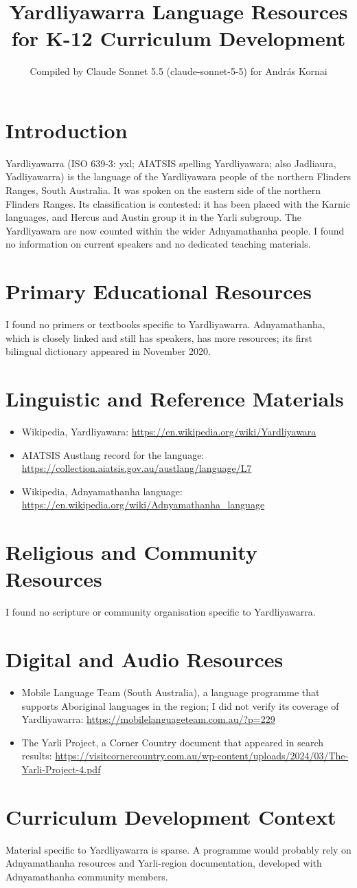 \documentclass[12pt]{article}
\title{Yardliyawarra Language Resources for K-12 Curriculum Development}
\author{Compiled by Claude Sonnet 5.5 (claude-sonnet-5-5) for Andr\'as Kornai}
\date{}
\begin{document}
\maketitle

\section{Introduction}
Yardliyawarra (ISO 639-3: yxl; AIATSIS spelling Yardliyawara; also Jadliaura, Yadliyawarra) is the language of the Yardliyawara people of the northern Flinders Ranges, South Australia. It was spoken on the eastern side of the northern Flinders Ranges. Its classification is contested: it has been placed with the Karnic languages, and Hercus and Austin group it in the Yarli subgroup. The Yardliyawara are now counted within the wider Adnyamathanha people. I found no information on current speakers and no dedicated teaching materials.

\section{Primary Educational Resources}
I found no primers or textbooks specific to Yardliyawarra. Adnyamathanha, which is closely linked and still has speakers, has more resources; its first bilingual dictionary appeared in November 2020.

\section{Linguistic and Reference Materials}
\begin{itemize}
\item Wikipedia, Yardliyawara: \url{https://en.wikipedia.org/wiki/Yardliyawara}
\item AIATSIS Austlang record for the language: \url{https://collection.aiatsis.gov.au/austlang/language/L7}
\item Wikipedia, Adnyamathanha language: \url{https://en.wikipedia.org/wiki/Adnyamathanha_language}
\end{itemize}

\section{Religious and Community Resources}
I found no scripture or community organisation specific to Yardliyawarra.

\section{Digital and Audio Resources}
\begin{itemize}
\item Mobile Language Team (South Australia), a language programme that supports Aboriginal languages in the region; I did not verify its coverage of Yardliyawarra: \url{https://mobilelanguageteam.com.au/?p=229}
\item The Yarli Project, a Corner Country document that appeared in search results: \url{https://visitcornercountry.com.au/wp-content/uploads/2024/03/The-Yarli-Project-4.pdf}
\end{itemize}

\section{Curriculum Development Context}
Material specific to Yardliyawarra is sparse. A programme would probably rely on Adnyamathanha resources and Yarli-region documentation, developed with Adnyamathanha community members.
\end{document}
